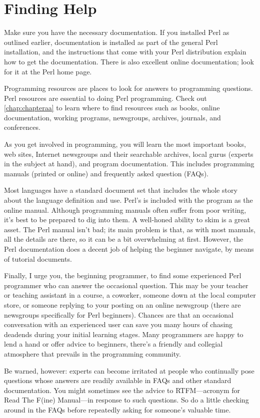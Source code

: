 \section{Finding Help}
Make sure you have the necessary documentation. If you installed Perl as outlined earlier, documentation is installed as part of the general Perl installation, and the instructions that come with your Perl distribution explain how to get the documentation. There is also excellent online documentation; look for it at the Perl home page.

Programming resources are places to look for answers to programming questions. Perl resources are essential to doing Perl programming. Check out \ref{chap:chapteraa} to learn where to find resources such as books, online documentation, working programs, newsgroups, archives, journals, and conferences.

As you get involved in programming, you will learn the most important books, web sites, Internet newsgroups and their searchable archives, local gurus (experts in the subject at hand), and program documentation. This includes programming manuals (printed or online) and frequently asked question (FAQs).

Most languages have a standard document set that includes the whole story about the language definition and use. Perl's is included with the program as the online manual. Although programming manuals often suffer from poor writing, it's best to be prepared to dig into them. A well-honed ability to skim is a great asset. The Perl manual isn't bad; its main problem is that, as with most manuals, all the details are there, so it can be a bit overwhelming at first. However, the Perl documentation does a decent job of helping the beginner navigate, by means of tutorial documents.

Finally, I urge you, the beginning programmer, to find some experienced Perl programmer who can answer the occasional question. This may be your teacher or teaching assistant in a course, a coworker, someone down at the local computer store, or someone replying to your posting on an online newsgroup (there are newsgroups specifically for Perl beginners). Chances are that an occasional conversation with an experienced user can save you many hours of chasing deadends during your initial learning stages. Many programmers are happy to lend a hand or offer advice to beginners, there's a friendly and collegial atmosphere that prevails in the programming community.

Be warned, however: experts can become irritated at people who continually pose questions whose answers are readily available in FAQs and other standard documentation. You might sometimes see the advice to RTFM—acronym for Read The F(ine) Manual—in response to such questions. So do a little checking around in the FAQs before repeatedly asking for someone's valuable time.

